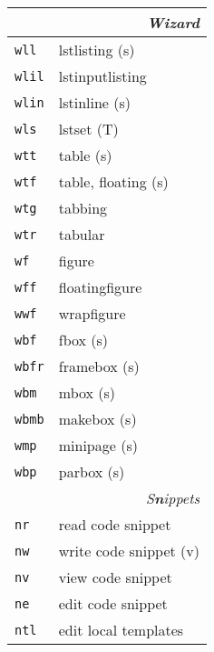 \documentclass[oneside,10pt,landscape,DIV16]{scrartcl}
\newcommand{\Map}[1] {\textbf{\textasciiacute}\texttt{#1}}
\begin{document}
\begin{multicols}{3}
\begin{center}
\begin{tabular}[]{|p{11mm}|p{60mm}|}
\hline
\multicolumn{2}{|r|}{\textsl{\textbf{W}izard}}\\[1.0ex]
\hline  \Map{wll}  & lstlisting               \hfill (s)\\
\hline  \Map{wlil} & lstinputlisting          \\
\hline  \Map{wlin} & lstinline                \hfill (s)\\
\hline  \Map{wls}  & lstset                   \hfill (T)\\
\hline
\hline  \Map{wtt}  & table                    \hfill (s)\\
\hline  \Map{wtf}  & table, floating          \hfill (s)\\
\hline  \Map{wtg}  & tabbing                  \\
\hline  \Map{wtr}  & tabular                  \\
\hline
\hline  \Map{wf}   & figure                   \\
\hline  \Map{wff}  & floatingfigure           \\
\hline  \Map{wwf}  & wrapfigure               \\
\hline
\hline  \Map{wbf}  & fbox                     \hfill (s)\\
\hline  \Map{wbfr} & framebox                 \hfill (s)\\
\hline  \Map{wbm}  & mbox                     \hfill (s)\\
\hline  \Map{wbmb} & makebox                  \hfill (s)\\
\hline  \Map{wmp}  & minipage                 \hfill (s)\\
\hline  \Map{wbp}  & parbox                   \hfill (s)\\
\hline
\hline
\multicolumn{2}{|r|}{\textsl{S\textbf{n}ippets}}                \\[1.0ex]
\hline \Map{nr}  & read code snippet         \\
\hline \Map{nw}  & write code snippet        \hfill (v)\\
\hline \Map{nv}  & view code snippet         \\
\hline \Map{ne}  & edit code snippet         \\
\hline
\hline \Map{ntl} & edit local templates      \\

\end{tabular}
\end{center}
\end{multicols}
\end{document}
